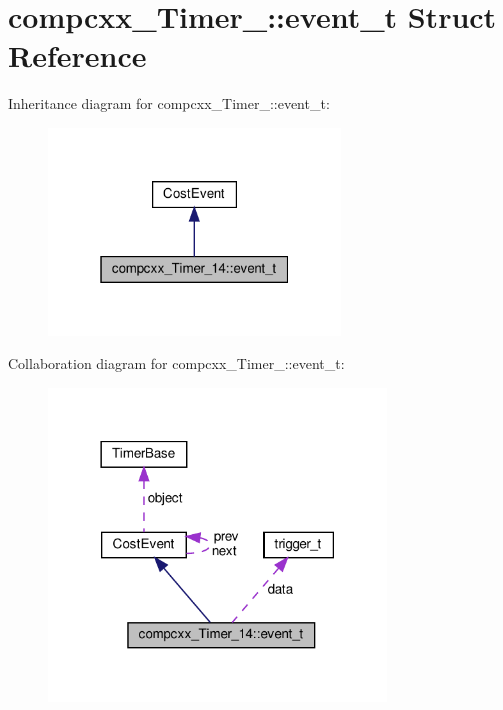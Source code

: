 \hypertarget{structcompcxx__Timer__14_1_1event__t}{}\section{compcxx\+\_\+\+Timer\+\_\+:\+:event\+\_\+t Struct Reference}
\label{structcompcxx__Timer__14_1_1event__t}


Inheritance diagram for compcxx\+\_\+\+Timer\+\_\+:\+:event\+\_\+t\+:\nopagebreak
\begin{figure}[H]
\begin{center}
\leavevmode
\includegraphics[width=220pt]{structcompcxx__Timer__14_1_1event__t__inherit__graph}
\end{center}
\end{figure}


Collaboration diagram for compcxx\+\_\+\+Timer\+\_\+:\+:event\+\_\+t\+:\nopagebreak
\begin{figure}[H]
\begin{center}
\leavevmode
\includegraphics[width=254pt]{structcompcxx__Timer__14_1_1event__t__coll__graph}
\end{center}
\end{figure}
